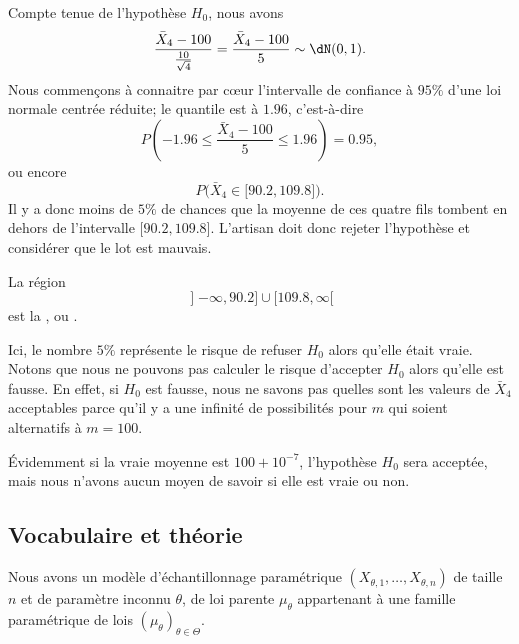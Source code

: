 Compte tenue de l'hypothèse \( H_0\), nous avons
\begin{equation}
    \frac{ \bar X_4-100 }{ \frac{ 10 }{ \sqrt{4} } }=\frac{ \bar X_4-100 }{ 5 }\sim\dN(0,1).
\end{equation}
Nous commençons à connaitre par cœur l'intervalle de confiance à \( 95\%\) d'une loi normale centrée réduite; le quantile est à \( 1.96\), c'est-à-dire
\begin{equation}
    P\left( -1.96\leq\frac{ \bar X_4-100 }{ 5 }\leq 1.96 \right)=0.95,
\end{equation}
ou encore
\begin{equation}
    P\big( \bar X_4\in\mathopen[ 90.2 , 109.8 \mathclose] \big).
\end{equation}
Il y a donc moins de \( 5\%\) de chances que la moyenne de ces quatre fils tombent en dehors de l'intervalle \( \mathopen[ 90.2 , 109.8 \mathclose]\). L'artisan doit donc rejeter l'hypothèse et considérer que le lot est mauvais.

La région
\begin{equation}
    \mathopen] -\infty , 90.2 \mathclose]\cup\mathopen[ 109.8 , \infty [
\end{equation}
est la , ou .

Ici, le nombre \( 5\%\) représente le risque de refuser \( H_0\) alors qu'elle était vraie. Notons que nous ne pouvons pas calculer le risque d'accepter \( H_0\) alors qu'elle est fausse. En effet, si \( H_0\) est fausse, nous ne savons pas quelles sont les valeurs de \( \bar X_4\) acceptables parce qu'il y a une infinité de possibilités pour \( m\) qui soient alternatifs à \( m=100\).

Évidemment si la vraie moyenne est \( 100+10^{-7}\), l'hypothèse \( H_0\) sera acceptée, mais nous n'avons aucun moyen de savoir si elle est vraie ou non.

\subsection{Vocabulaire et théorie}

Nous avons un modèle d'échantillonnage paramétrique \(  (X_{\theta,1},\ldots,X_{\theta,n})  \) de taille \( n\) et de paramètre inconnu \( \theta\), de loi parente \( \mu_{\theta}\) appartenant à une famille paramétrique de lois \( (\mu_{\theta})_{\theta\in\Theta}\).

